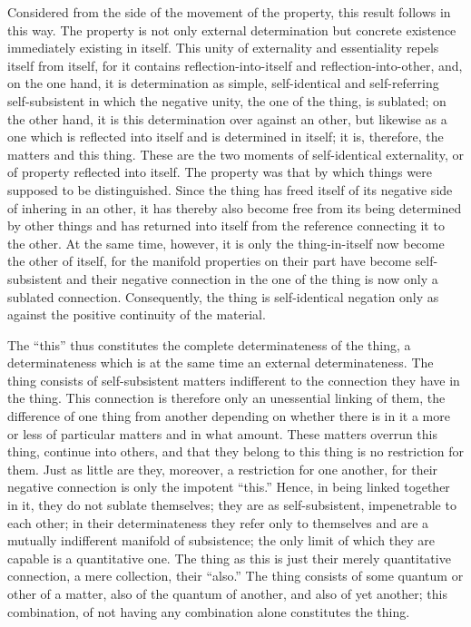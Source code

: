 Considered from the side of the movement of the property,
this result follows in this way.
The property is not only external determination but
concrete existence immediately existing in itself.
This unity of externality and essentiality repels itself from itself,
for it contains reflection-into-itself and reflection-into-other,
and, on the one hand, it is determination as simple,
self-identical and self-referring self-subsistent in which the negative unity,
the one of the thing, is sublated;
on the other hand, it is this determination over against an other,
but likewise as a one which is reflected into itself
and is determined in itself;
it is, therefore, the matters and this thing.
These are the two moments of self-identical externality,
or of property reflected into itself.
The property was that by which things
were supposed to be distinguished.
Since the thing has freed itself of its
negative side of inhering in an other,
it has thereby also become free
from its being determined by other things
and has returned into itself
from the reference connecting it to the other.
At the same time, however, it is only the thing-in-itself
now become the other of itself,
for the manifold properties on their part
have become self-subsistent
and their negative connection
in the one of the thing is
now only a sublated connection.
Consequently, the thing is self-identical negation
only as against the positive continuity of the material.

The “this” thus constitutes the
complete determinateness of the thing,
a determinateness which is at the same time
an external determinateness.
The thing consists of self-subsistent matters
indifferent to the connection they have in the thing.
This connection is therefore only
an unessential linking of them,
the difference of one thing from another
depending on whether there is in it
a more or less of particular matters
and in what amount.
These matters overrun this thing,
continue into others,
and that they belong to this thing
is no restriction for them.
Just as little are they, moreover,
a restriction for one another,
for their negative connection is
only the impotent “this.”
Hence, in being linked together in it,
they do not sublate themselves;
they are as self-subsistent,
impenetrable to each other;
in their determinateness they refer only to themselves
and are a mutually indifferent manifold of subsistence;
the only limit of which they are capable is a quantitative one.
The thing as this is just their merely quantitative connection,
a mere collection, their “also.”
The thing consists of some quantum or other of a matter,
also of the quantum of another, and also of yet another;
this combination, of not having any combination alone
constitutes the thing.

